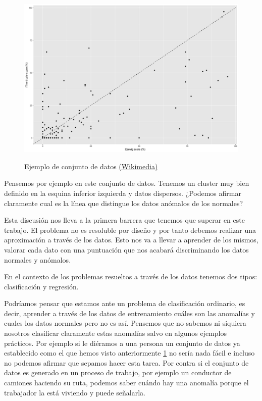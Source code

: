\begin{figure}[!h]
	\centering
	\includegraphics[scale=0.3]{imagenes/1_introduccion}
	\label{1_introduccion}
	\caption{Ejemplo de conjunto de datos \href{https://commons.wikimedia.org/wiki/File:Earwig_ithenticate_scatterplot.png}{(Wikimedia)}}
\end{figure}

Pensemos por ejemplo en este conjunto de datos. Tenemos un cluster muy bien definido en la esquina inferior izquierda y datos dispersos. ¿Podemos afirmar claramente cual es la línea que distingue los datos anómalos de los normales? 

Esta discusión nos lleva a la primera barrera que tenemos que superar en este trabajo. El problema no es resoluble por diseño y por tanto debemos realizar una aproximación a través de los datos. Esto nos va a llevar a aprender de los mismos, valorar cada dato con una puntuación que nos acabará discriminando los datos normales y anómalos.

En el contexto de los problemas resueltos a través de los datos tenemos dos tipos: clasificación y regresión. 

Podríamos pensar que estamos ante un problema de clasificación ordinario, es decir, aprender a través de los datos de entrenamiento cuáles son las anomalías y cuales los datos normales pero no es así. Pensemos que no sabemos ni siquiera nosotros clasificar claramente estas anomalías salvo en algunos ejemplos prácticos. Por ejemplo si le diéramos a una persona un conjunto de datos ya establecido como el que hemos visto anteriormente \ref{1_introduccion} no sería nada fácil e incluso no podemos afirmar que sepamos hacer esta tarea. Por contra si el conjunto de datos es generado en un proceso de trabajo, por ejemplo un conductor de camiones haciendo su ruta, podemos saber cuándo hay una anomalía porque el trabajador la está viviendo y puede señalarla.

